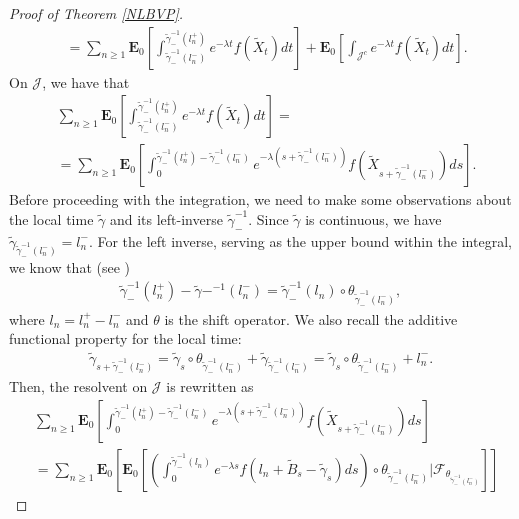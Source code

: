 \documentclass[11pt,a4paper]{article}
\theoremstyle{definition}
\theoremstyle{remark}
\begin{document}
\begin{proof}[Proof of Theorem \ref{NLBVP}]
\begin{align*}
		&=\sum_{n \geq 1} \mathbf{E}_{0}  \left[\int_{\widetilde{\gamma}_{-}^{-1}(l_n^-)}^{\widetilde{\gamma}_{-}^{-1}(l_n^+)} e^{-\lambda t} f(\widetilde{X}_t) dt\right] + \mathbf{E}_{0}  \left[\int_{\mathcal{J}^c} e^{-\lambda t} f(\widetilde{X}_t) dt\right].
	\end{align*} 
	On \(\mathcal{J}\), we have that
	\begin{align*}
		&\sum_{n \geq 1} \mathbf{E}_{0}  \left[\int_{\widetilde{\gamma}_{-}^{-1}(l_n^-)}^{\widetilde{\gamma}_{-}^{-1}(l_n^+)} e^{-\lambda t} f(\widetilde{X}_t) dt\right]=\\
		&=\sum_{n \geq 1}  \mathbf{E}_{0} \left[\int_0^{\widetilde{\gamma}_{-}^{-1}(l_n^+)-\widetilde{\gamma}_{-}^{-1}(l_n^-)} e^{-\lambda (s + \widetilde{\gamma}_{-}^{-1}(l_n^-))} f(\widetilde{X}_{s + \widetilde{\gamma}_{-}^{-1}(l_n^-)}) ds\right].
	\end{align*}
	Before proceeding with the integration, we need to make some observations about the local time $\widetilde{\gamma}$ and its left-inverse $\widetilde{\gamma}_{-}^{-1}$. Since $\widetilde{\gamma}$ is continuous, we have $\widetilde{\gamma}_{\widetilde{\gamma}^{-1}_{-}(l_n^-)}=l_n^-$. For the left inverse, serving as the upper bound within the integral, we know that (see \cite[Proposition 1.3, Chapter X]{revuz-yor})
	\begin{align*}
		\widetilde{\gamma}^{-1}_{-}(l_n^+) - \widetilde{\gamma}{-}^{-1}(l_n^-)=\widetilde{\gamma}_{-}^{-1}(l_n) \circ \theta _{\widetilde{\gamma}^{-1}_{-}(l_n^-) },
	\end{align*}
	where $l_n=l_n^+ - l_n^-$ and $\theta$ is the shift operator. We also recall the additive functional property for the local time:
	\begin{align*}
		\widetilde{\gamma}_{s+\widetilde{\gamma}^{-1}_{-}(l_n^-)}=\widetilde{\gamma}_s \circ \theta_{\widetilde{\gamma}^{-1}_{-}(l_n^-) } + \widetilde{\gamma}_{\widetilde{\gamma}^{-1}_{-}(l_n^-)}= \widetilde{\gamma}_s \circ \theta_{\widetilde{\gamma}^{-1}_{-}(l_n^-) } + l_n^-.
	\end{align*}
	Then, the resolvent on \(\mathcal{J}\) is rewritten as
	\begin{align*}
		&\sum_{n \geq 1}  \mathbf{E}_{0} \left[\int_0^{\widetilde{\gamma}_{-}^{-1}(l_n^+)-\widetilde{\gamma}_{-}^{-1}(l_n^-)} e^{-\lambda (s + \widetilde{\gamma}_{-}^{-1}(l_n^-))} f(\widetilde{X}_{s + \widetilde{\gamma}_{-}^{-1}(l_n^-)}) ds\right]\\
		&=\sum_{n \geq 1} \mathbf{E}_{0}\left[ \mathbf{E}_{0} \left[ \left(\int_0^{\widetilde{\gamma}_{-}^{-1}(l_n)} e^{-\lambda s } f(l_n + \widetilde{B}_s - \widetilde{\gamma}_s) ds\right) \circ \theta_{\widetilde{\gamma}^{-1}_{-}(l_n^-) }\Big\vert \mathcal{F}_{\theta_{\widetilde{\gamma}_{-}^{-1}(l_n^-)}}\right]\right]

\end{align*}
\end{proof}
\end{document}
